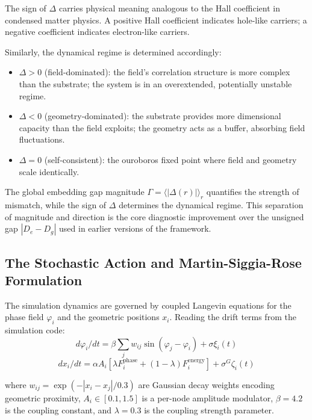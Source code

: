 \documentclass[11pt,a4paper]{article}
\begin{document}
The sign of $\Delta$ carries physical meaning analogous to the Hall coefficient in condensed matter physics. A positive Hall coefficient indicates hole-like carriers; a negative coefficient indicates electron-like carriers.

Similarly, the dynamical regime is determined accordingly:

\begin{itemize}
\item $\Delta > 0$ (field-dominated): the field's correlation structure is more complex than the substrate; the system is in an overextended, potentially unstable regime.

\item $\Delta < 0$ (geometry-dominated): the substrate provides more dimensional capacity than the field exploits; the geometry acts as a buffer, absorbing field fluctuations.

\item $\Delta = 0$ (self-consistent): the ouroboros fixed point where field and geometry scale identically.
\end{itemize}

The global embedding gap magnitude $\Gamma = \langle|\Delta(r)|\rangle_r$ quantifies the strength of mismatch, while the sign of $\Delta$ determines the dynamical regime. This separation of magnitude and direction is the core diagnostic improvement over the unsigned gap $|D_e - D_g|$ used in earlier versions of the framework.

\subsection{The Stochastic Action and Martin-Siggia-Rose Formulation}

The simulation dynamics are governed by coupled Langevin equations for the phase field $\varphi_i$ and the geometric positions $x_i$. Reading the drift terms from the simulation code:
\begin{equation}
d\varphi_i/dt = \beta \sum_j w_{ij} \sin(\varphi_j - \varphi_i) + \sigma\xi_i(t)
\end{equation}
\begin{equation}
dx_i/dt = \alpha A_i [\lambda F_{i}^{\text{phase}} + (1-\lambda) F_{i}^{\text{energy}}] + \sigma^G\zeta_i(t)
\end{equation}

where $w_{ij} = \exp(-|x_i - x_j|/0.3)$ are Gaussian decay weights encoding geometric proximity, $A_i \in [0.1, 1.5]$ is a per-node amplitude modulator, $\beta = 4.2$ is the coupling constant, and $\lambda = 0.3$ is the coupling strength parameter.
\end{document}
